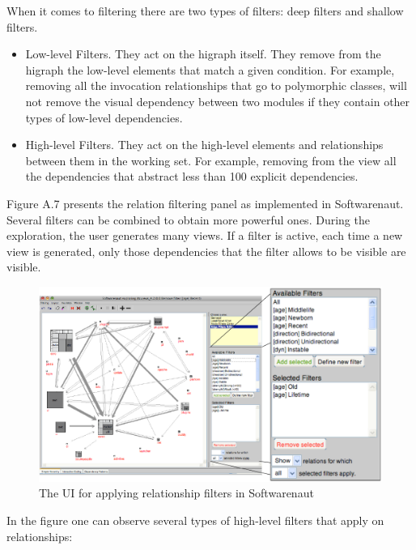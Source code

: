 \documentclass[preprint,12pt]{elsarticle}
\begin{document}
When it comes to filtering there are two types of filters: deep filters and shallow filters.

\begin{itemize}

\item Low-level Filters. They act on the higraph itself. They remove from the higraph the low-level elements that match a given condition. For example, removing all the invocation relationships that go to polymorphic classes, will not remove the visual dependency between two modules if they contain other types of low-level dependencies.

\item High-level Filters. They act on the high-level elements and relationships between them in the working set. For example, removing from the view all the dependencies that abstract less than 100 explicit dependencies.

\end{itemize}


Figure A.7 presents the relation filtering panel as implemented in Softwarenaut. Several filters can be combined to obtain more powerful ones. During the exploration, the user generates many views. If a filter is active, each time a new view is generated, only those dependencies that the filter allows to be visible are visible.


\begin{figure}[h]
\begin{center}
\includegraphics[width=\linewidth]{images/SnautFilteringPanel}
\caption{The UI for applying relationship filters in Softwarenaut}
\label{}
\end{center}
\end{figure}

In the figure one can observe several types of high-level filters that apply on relationships: 
\end{document}
